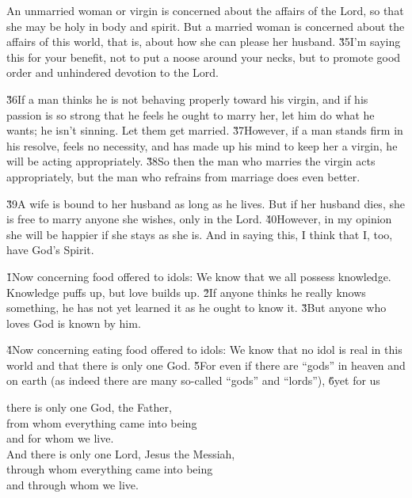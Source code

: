 An unmarried woman or virgin is concerned about the affairs of the Lord, so that she may be holy in body and spirit. But a married woman is concerned about the affairs of this world, that is, about how she can please her husband. \v{35}I'm saying this for your benefit, not to put a noose around your necks, but to promote good order and unhindered devotion to the Lord.

\v{36}If a man thinks he is not behaving properly toward his virgin, and if his passion is so strong that he feels he ought to marry her, let him do what he wants; he isn't sinning. Let them get married. \v{37}However, if a man stands firm in his resolve, feels no necessity, and has made up his mind to keep her a virgin, he will be acting appropriately. \v{38}So then the man who marries the virgin acts appropriately, but the man who refrains from marriage does even better.

\v{39}A wife is bound to her husband as long as he lives. But if her husband dies, she is free to marry anyone she wishes, only in the Lord. \v{40}However, in my opinion she will be happier if she stays as she is. And in saying this, I think that I, too, have God's Spirit.

\v{1}Now concerning food offered to idols: We know that we all possess knowledge. Knowledge puffs up, but love builds up. \v{2}If anyone thinks he really knows something, he has not yet learned it as he ought to know it. \v{3}But anyone who loves God is known by him.

\v{4}Now concerning eating food offered to idols: We know that no idol is real in this world and that there is only one God. \v{5}For even if there are ``gods'' in heaven and on earth (as indeed there are many so-called ``gods'' and ``lords''), \v{6}yet for us

\begin{poetry}
\poeml there is only one God, the Father, \\
\poemll    from whom everything came into being \\
\poemlll       and for whom we live. \\
\poeml And there is only one Lord, Jesus the Messiah, \\
\poemll    through whom everything came into being \\
\poemlll       and through whom we live.
\end{poetry}

